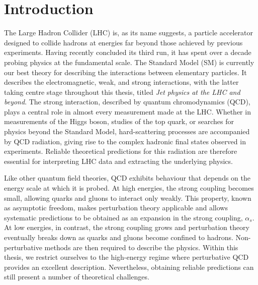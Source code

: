 \chapter{Introduction}
\label{ch:intro}

The Large Hadron Collider (LHC) is, as its name suggests, a particle accelerator
designed to collide hadrons at energies far beyond those achieved by previous
experiments. Having recently concluded its third run, it has spent over a decade
probing physics at the fundamental scale. The Standard Model (SM) is currently our
best theory for describing the interactions between elementary particles. It
describes the electromagnetic, weak, and strong interactions, with the latter
taking centre stage throughout this thesis, titled \emph{Jet physics at the LHC
and beyond}. The strong interaction, described by quantum chromodynamics (QCD),
plays a central role in almost every measurement made at the LHC. Whether in
measurements of the Higgs boson, studies of the top quark, or searches for physics
beyond the Standard Model, hard-scattering processes are accompanied by QCD
radiation, giving rise to the complex hadronic final states observed in
experiments. Reliable theoretical predictions for this radiation are therefore
essential for interpreting LHC data and extracting the underlying physics.

Like other quantum field theories, QCD exhibits behaviour that depends on the
energy scale at which it is probed. At high energies, the strong coupling becomes
small, allowing quarks and gluons to interact only weakly. This property, known as
asymptotic freedom, makes perturbation theory applicable and allows systematic
predictions to be obtained as an expansion in the strong coupling, $\alpha_s$. At low energies,
in contrast, the strong coupling grows and perturbation theory eventually breaks
down as quarks and gluons become confined to hadrons. Non-perturbative
methods are then required to describe the physics. Within this thesis, we restrict
ourselves to the high-energy regime where perturbative QCD provides
an excellent description. Nevertheless, obtaining reliable predictions can still present a number of
theoretical challenges.

